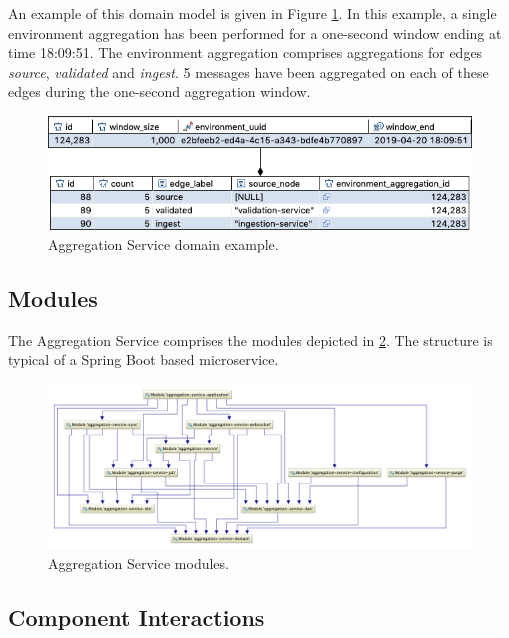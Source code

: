 An example of this domain model is given in Figure \ref{aggregation_svc_domain_model_example}. In this example, a single environment aggregation has been performed for a one-second window ending at time 18:09:51. The environment aggregation comprises aggregations for edges \textit{source}, \textit{validated} and \textit{ingest}. 5 messages have been aggregated on each of these edges during the one-second aggregation window.

\begin{figure}[H]
	\centering  
	\includegraphics[width=\linewidth]{figures/impl/aggregation/domain_example.png}
	\caption{Aggregation Service domain example.}
	\label{aggregation_svc_domain_model_example}
\end{figure}

\subsection{Modules}\label{aggregation_service_modules}
The Aggregation Service comprises the modules depicted in  \ref{aggregation_svc_modules}. The structure is typical of a Spring Boot based microservice.

\begin{figure}[H]
	\centering  
	\includegraphics[width=\linewidth]{figures/impl/aggregation/modules.png}
	\caption{Aggregation Service modules.}
	\label{aggregation_svc_modules}
\end{figure}

\subsection{Component Interactions}

